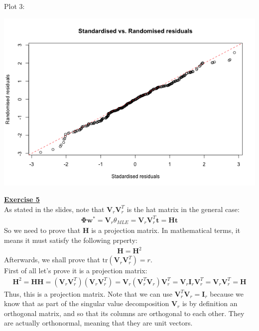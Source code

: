 \documentclass[a4paper, 11pt]{article}
\begin{document}
Plot 3:\\
\begin{center}
\includegraphics[scale=0.7]{ps1_plot3.png}
\end{center}
\newpage
\textbf{\underline{Exercise 5}}\\
\newline As stated in the slides, note that $\mathbf{V}_{r} \mathbf{V}_{r}^{T}$ is the hat matrix in the general case:\\
\begin{eqnarray}
\mathbf{\Phi} \mathbf{w}^{*} = \mathbf{V}_{r} \theta_{MLE} = \mathbf{V}_{r} \mathbf{V}_{r}^{T}  \mathbf{t} = \mathbf{H} \mathbf{t} \nonumber
\end{eqnarray}
So we need to prove that $\mathbf{H}$ is a projection matrix. In mathematical terms, it means it must satisfy the following prperty:
\begin{eqnarray}
\mathbf{H} = \mathbf{H}^2 \nonumber
\end{eqnarray}
Afterwards, we shall prove that $\text{tr}\left( \mathbf{V}_r \mathbf{V}_{r}^{T} \right) = r$.\\
\newline First of all let's prove it is a projection matrix:
\begin{eqnarray}
\mathbf{H}^2 = \mathbf{H} \mathbf{H} = \left( \mathbf{V}_r \mathbf{V}_{r}^{T} \right) \left( \mathbf{V}_r \mathbf{V}_{r}^{T} \right) = \mathbf{V}_r \left( \mathbf{V}_{r}^{T} \mathbf{V}_r \right) \mathbf{V}_{r}^{T}  =  \mathbf{V}_r \mathbf{I}_r \mathbf{V}_{r}^{T} = \mathbf{V}_r \mathbf{V}_{r}^{T} = \mathbf{H} \nonumber
\end{eqnarray}
Thus, this is a projection matrix. Note that we can use $\mathbf{V}_{r}^{T} \mathbf{V}_r = \mathbf{I}_r$ because we know that as part of the singular value decomposition $\mathbf{V}_r$ is by definition an orthogonal matrix, and so that its columns are orthogonal to each other. They are actually orthonormal, meaning that they are unit vectors.\\
\end{document}
